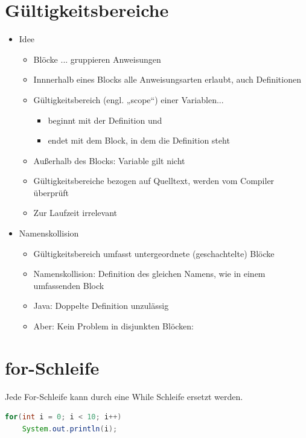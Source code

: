 \section{Gültigkeitsbereiche}
\begin{itemize}
	\item Idee
	\begin{itemize}
		\item Blöcke {...} gruppieren Anweisungen
		\item Innnerhalb eines Blocks alle Anweisungsarten erlaubt, auch Definitionen
		\item Gültigkeitsbereich (engl. „scope“) einer Variablen...
		\begin{itemize}
			\item beginnt mit der Definition und
			\item endet mit dem Block, in dem die Definition steht
		\end{itemize}
		\item Außerhalb des Blocks: Variable gilt nicht
		\item Gültigkeitsbereiche bezogen auf Quelltext, werden vom Compiler 			
			überprüft
		\item Zur Laufzeit irrelevant
	\end{itemize}
	\item Namenskollision
	\begin{itemize}
		\item Gültigkeitsbereich umfasst untergeordnete (geschachtelte) Blöcke
		\item Namenskollision: Definition des gleichen Namens, wie in einem 	
			umfassenden Block
		\item Java: Doppelte Definition unzulässig
		\item Aber: Kein Problem in disjunkten Blöcken:
	\end{itemize}
\end{itemize}
%
%
%
\section{for-Schleife}
Jede For-Schleife kann durch eine While Schleife ersetzt werden. 
 \begin{lstlisting}[language=JAVA]
for(int i = 0; i < 10; i++)
	System.out.println(i);
 \end{lstlisting}
